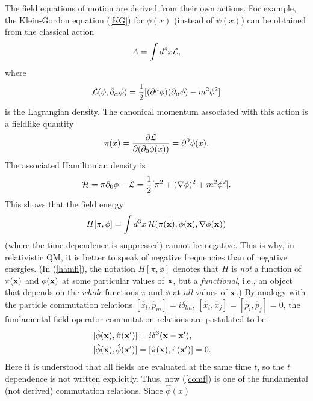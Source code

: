 \documentclass[12pt]{article}
\begin{document}
The field equations of motion are derived from their own
actions. For example, the Klein-Gordon equation (\ref{KG})
for $\phi(x)$ (instead of $\psi(x)$)
can be obtained from the classical action
\begin{equation} 
A=\int d^4x {\cal L} ,
\end{equation}
where
\begin{equation}\label{lagr}
{\cal L}(\phi,\partial_{\alpha}\phi)=
\frac{1}{2} [(\partial^{\mu}\phi)(\partial_{\mu}\phi)
-m^2\phi^2 ]    
\end{equation}
is the Lagrangian density. The canonical momentum associated
with this action is a fieldlike quantity
\begin{equation}
\pi(x)=\frac{\partial{\cal L}}{\partial (\partial_0\phi(x))}
=\partial^0\phi(x) .
\end{equation}
The associated Hamiltonian density is
\begin{equation}\label{hamden}
{\cal H}=\pi \partial_0\phi - {\cal L}=
\frac{1}{2} [\pi^2 + (\nabla\phi)^2 +m^2\phi^2] .
\end{equation}
This shows that the field energy 
\begin{equation}\label{hamfi}
H[\pi,\phi]=\int d^3x\, {\cal H}(\pi({\bf x}),\phi({\bf x}),
\nabla\phi({\bf x}) ) 
\end{equation}
(where the time-dependence is suppressed)
cannot be negative. 
This is why, in relativistic QM, it is better to speak
of negative frequencies than of negative energies.
(In (\ref{hamfi}), the notation $H[\pi,\phi]$ denotes 
that $H$ is {\em not} a function of 
$\pi({\bf x})$ and $\phi({\bf x})$ at some particular values of 
${\bf x}$, but a {\em functional}, i.e., an object that 
depends on the {\em whole} functions $\pi$ and $\phi$ at
{\em all} values of ${\bf x}$.) 
By analogy with the particle commutation relations
$[\hat{x}_l,\hat{p}_m]=i\delta_{lm}$, 
$[\hat{x}_i,\hat{x}_j]=[\hat{p}_i,\hat{p}_j]=0$, 
the fundamental field-operator commutation relations are
postulated to be
\begin{eqnarray}\label{comfund}
& [\hat{\phi}({\bf x}),\hat{\pi}({\bf x}')]=i\delta^3({\bf x}-{\bf x}') , &
\nonumber \\
& [\hat{\phi}({\bf x}),\hat{\phi}({\bf x}')]=
[\hat{\pi}({\bf x}),\hat{\pi}({\bf x}')]=0 .
\end{eqnarray} 
Here it is understood that all fields are evaluated at the same time $t$, 
so the $t$ dependence is not written explicitly.
Thus, now (\ref{comf}) is one of the fundamental (not derived) 
commutation relations. Since $\hat{\phi}(x)$ 
\end{document}
